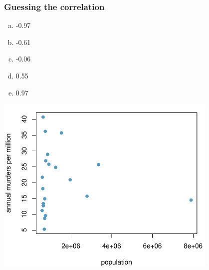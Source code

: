 \documentclass[11pt,containsverbatim,handout,xcolor=xelatex,dvipsnames,table]{beamer}
\newcommand{\solnMult}[1]{#1}
\begin{document}

\begin{frame}
\frametitle{Guessing the correlation}


{
\begin{enumerate}[(a)]
\item -0.97
\item -0.61
\item \solnMult{-0.06}
\item 0.55
\item 0.97
\end{enumerate}
}
{
\begin{center}
\includegraphics[width=0.8\textwidth]{figures/murder/annual_murders_per_mil_population}
\end{center}
}

\end{frame}

\end{document}
